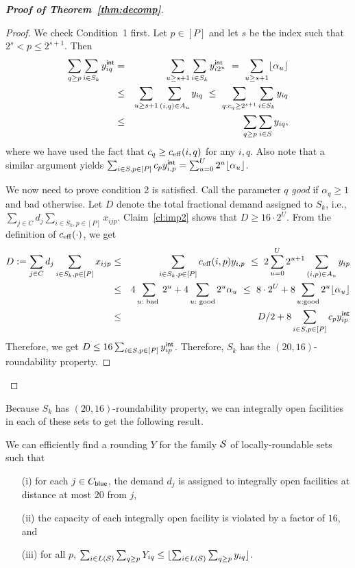 \begin{proof}[{\bf Proof of Theorem~\ref{thm:decomp}}]
\begin{proof}
We check Condition~1 first. Let $p \in [P]$ and let $s$ be the index such that $2^s < p \leq 2^{s+1}$. Then
\begin{eqnarray*}
\sum_{q \geq p} \sum_{i \in S_k} \y_{iq} & = & \sum_{u \geq s+1} \sum_{i \in S_k} \y_{i2^u} \ = \ \sum_{u \geq s+1} \floor{\alpha_u }\\
& \leq & \sum_{u \geq s+1} \sum_{(i,q) \in A_u} y_{iq} \ \leq \ \sum_{q: c_q \geq 2^{s+1}} \sum_{i \in S_k} y_{iq} \\
& \leq & \sum_{q \geq p}\sum_{i\in S} y_{iq},
\end{eqnarray*}
 where we have used the fact that $c_q \geq c_{\mathrm{eff}}(i,q)$ for any $i,q$. 
Also note that a similar argument yields $\sum_{i\in S,p\in [P]} c_p y^{{\mathsf{int}}}_{i,p} = \sum_{u=0}^U 2^u\lfloor\alpha_u\rfloor$.

We now need to prove condition 2 is satisfied. \smallskip
Call the parameter $q$ {\em good} if $\alpha_q \geq 1$ and bad otherwise. Let $D$ denote the total fractional demand assigned to $S_k$, i.e., 
$\sum_{j\in C} d_j \sum_{i\in S_k,p\in [P]} x_{ijp}$. Claim~\ref{cl:imp2} shows that $D \geq 16 \cdot 2^U$. 
From the definition of $c_{\mathrm{eff}}(\cdot)$, we get
\begin{eqnarray*}
D := \sum_{j\in C} d_j \sum_{i\in S_k,p\in [P]} x_{ijp} & \leq &  \sum_{i\in S_k,p\in [P]} c_{\mathrm{eff}}(i,p)y_{i,p}	\  \leq \ 2 \sum_{u=0}^U 2^{u+1} \sum_{(i,p)\in A_u} y_{ip} \\
																				& \leq & 4\sum_{u: \textrm{ bad }} 2^u + 4\sum_{u: \textrm{ good}} 2^u \alpha_u
																				\  \leq \  8\cdot 2^U + 8\sum_{u: \textrm{good}}2^u \lfloor\alpha_u\rfloor  \\
																				& \leq & D/2 + 8\sum_{i\in S,p\in [P]}c_py^{{\mathsf{int}}}_{ip}
\end{eqnarray*}
Therefore, we get $D \leq 16\sum_{i\in S,p\in [P]} y^{{\mathsf{int}}}_{ip}$. Therefore, $S_k$ has the $(20,16)$-roundability property.
\end{proof}
\end{proof}

Because $S_k$ has $(20,16)$-roundability property, we can integrally open facilities in each of these sets to get the following result. 
\begin{corollary} \label{cor:combine-local}
We can efficiently find a rounding $Y$ for the family ${\cal S}$ of locally-roundable sets such that
\begin{enumerate}
\item[(i)] for each $j \in C_{\mathsf{blue}}$, the demand $d_j$ is assigned to integrally open facilities at distance at most $20$ from $j$,
\item[(ii)] the capacity of each integrally open facility is violated by a factor of $16$, and
\item[(iii)] for all $p$, $\sum_{i \in L({\cal S})} \sum_{q \geq p} Y_{iq} \leq \lfloor\sum_{i \in L({\cal S})} \sum_{q \geq p} y_{iq}\rfloor$.
\end{enumerate}
\end{corollary}



